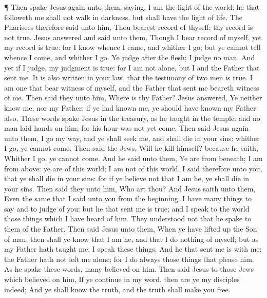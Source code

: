  ¶ Then spake Jesus again unto them, saying, I am the light
of the world: he that followeth me shall not walk in darkness, but shall
have the light of life.  The Pharisees therefore said unto
him, Thou bearest record of thyself; thy record is not true.
 Jesus answered and said unto them, Though I bear record of
myself, yet my record is true: for I know whence I came, and whither I
go; but ye cannot tell whence I come, and whither I go.  Ye
judge after the flesh; I judge no man.  And yet if I judge,
my judgment is true: for I am not alone, but I and the Father that sent
me.  It is also written in your law, that the testimony of
two men is true.  I am one that bear witness of myself, and
the Father that sent me beareth witness of me.  Then said
they unto him, Where is thy Father? Jesus answered, Ye neither know me,
nor my Father: if ye had known me, ye should have known my Father also.
 These words spake Jesus in the treasury, as he taught in
the temple: and no man laid hands on him; for his hour was not yet come.
 Then said Jesus again unto them, I go my way, and ye shall
seek me, and shall die in your sins: whither I go, ye cannot come.
 Then said the Jews, Will he kill himself? because he
saith, Whither I go, ye cannot come.  And he said unto
them, Ye are from beneath; I am from above: ye are of this world; I am
not of this world.  I said therefore unto you, that ye
shall die in your sins: for if ye believe not that I am he, ye shall die
in your sins.  Then said they unto him, Who art thou? And
Jesus saith unto them, Even the same that I said unto you from the
beginning.  I have many things to say and to judge of you:
but he that sent me is true; and I speak to the world those things which
I have heard of him.  They understood not that he spake to
them of the Father.  Then said Jesus unto them, When ye
have lifted up the Son of man, then shall ye know that I am he, and that
I do nothing of myself; but as my Father hath taught me, I speak these
things.  And he that sent me is with me: the Father hath
not left me alone; for I do always those things that please him.
 As he spake these words, many believed on him.
 Then said Jesus to those Jews which believed on him, If ye
continue in my word, then are ye my disciples indeed;  And
ye shall know the truth, and the truth shall make you free.

